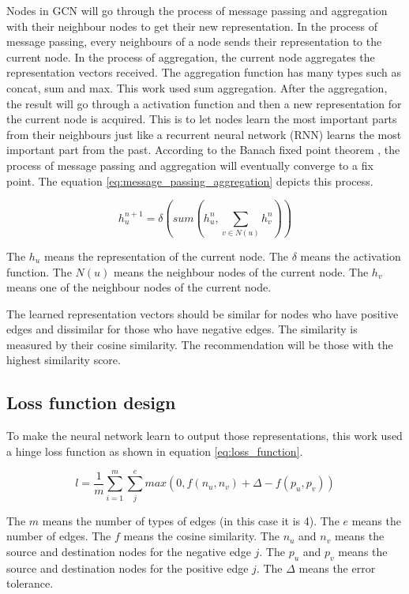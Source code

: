 \documentclass[11pt,twoside]{report}
\begin{document}
Nodes in GCN will go through the process of message passing and aggregation with their neighbour nodes to get their new representation. In the process of message passing, every neighbours of a node sends their representation to the current node. In the process of aggregation, the current node aggregates the representation vectors received. The aggregation function has many types such as concat, sum and max. This work used sum aggregation. After the aggregation, the result will go through a activation function and then a new representation for the current node is acquired. This is to let nodes learn the most important parts from their neighbours just like a recurrent neural network (RNN) learns the most important part from the past. According to the Banach
fixed point theorem \cite{Khamsi_2001}, the process of message passing and aggregation will eventually converge to a fix point. The equation \ref{eq:message_passing_aggregation} depicts this process.

\begin{equation}
    h_u^{n+1}=\delta(sum(h_u^n, \sum_{v\in{N(u)}}h_v^n))
    \label{eq:message_passing_aggregation}
\end{equation}

The $h_u$ means the representation of the current node. The $\delta$ means the activation function. The $N(u)$ means the neighbour nodes of the current node. The $h_v$ means one of the neighbour nodes of the current node.

The learned representation vectors should be similar for nodes who have positive edges and dissimilar for those who have negative edges. The similarity is measured by their cosine similarity. The recommendation will be those with the highest similarity score.

\subsection{Loss function design}
To make the neural network learn to output those representations, this work used a hinge loss function as shown in equation \ref{eq:loss_function}.

\begin{equation}
    l=\frac{1}{m}\sum_{i=1}^{m}\sum_{j}^{e} max(0, f(n_u, n_v)+\Delta-f(p_u, p_v))
    \label{eq:loss_function}
\end{equation}

The $m$ means the number of types of edges (in this case it is 4). The $e$ means the number of edges. The $f$ means the cosine similarity. The $n_u$ and $n_v$ means the source and destination nodes for the negative edge $j$. The $p_u$ and $p_v$ means the source and destination nodes for the positive edge $j$. The $\Delta$ means the error tolerance.
\end{document}
